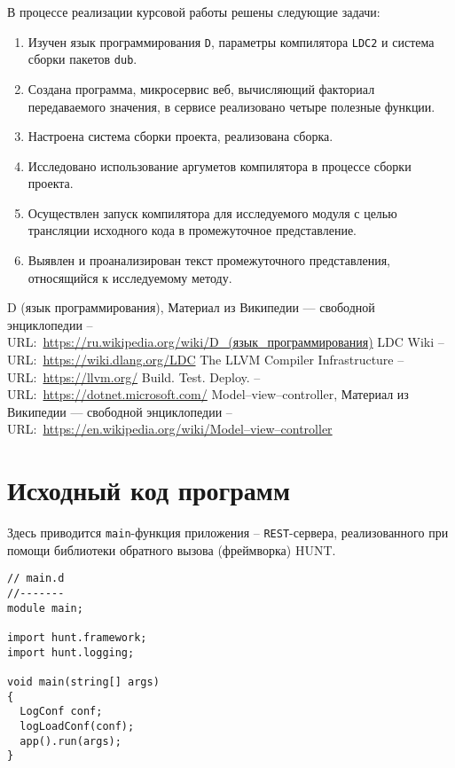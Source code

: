 \documentclass[732]{studrep}
\begin{document}
В процессе реализации курсовой работы решены следующие задачи:
\begin{enumerate}
\item Изучен язык программирования \verb|D|, параметры компилятора \verb|LDC2| и система сборки пакетов \verb|dub|.
\item Создана программа, микросервис веб, вычисляющий факториал передаваемого значения, в сервисе реализовано четыре полезные функции.
\item Настроена система сборки проекта, реализована сборка.
\item Исследовано использование аргуметов компилятора в процессе сборки проекта.
\item Осуществлен запуск компилятора для исследуемого модуля с целью трансляции исходного кода в промежуточное представление.
\item Выявлен и проанализирован текст промежуточного представления, относящийся к исследуемому методу.
\end{enumerate}

\begin{thebibliography}{9}
 D (язык программирования), Материал из Википедии — свободной энциклопедии -- URL:~\url{https://ru.wikipedia.org/wiki/D_(язык_программирования)}
 LDC Wiki -- URL:~\url{https://wiki.dlang.org/LDC}
 The LLVM Compiler Infrastructure -- URL:~\url{https://llvm.org/}
 Build. Test. Deploy. -- URL:~\url{https://dotnet.microsoft.com/}
 Model–view–controller, Материал из Википедии — свободной энциклопедии -- URL:~\url{https://en.wikipedia.org/wiki/Model–view–controller}
\end{thebibliography}

\appendices

\appendix
\chapter{Исходный код программ}

Здесь приводится \texttt{main}-функция приложения -- \texttt{REST}-сервера, реализованного при помощи библиотеки обратного вызова (фреймворка) HUNT.
\begin{verbatim}
// main.d
//-------
module main;

import hunt.framework;
import hunt.logging;

void main(string[] args)
{
  LogConf conf;
  logLoadConf(conf);
  app().run(args);
}
\end{verbatim}
\end{document}
